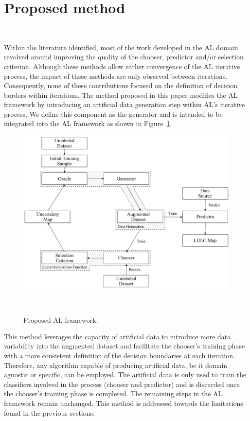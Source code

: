 \documentclass[parskip=full]{scrartcl}
\begin{document}
\section{Proposed method}~\label{sec:proposed-method}

Within the literature identified, most of the work developed in the AL domain
revolved around improving the quality of the chooser, predictor and/or selection
criterion. Although these methods allow earlier convergence of the AL iterative
process, the impact of these methods are only observed between iterations.
Consequently, none of these contributions focused on the definition of decision
borders within iterations. The method proposed in this paper modifies the AL
framework by introducing an artificial data generation step within AL's
iterative process. We define this component as the generator and is intended to
be integrated into the AL framework as shown in Figure~\ref{fig:al_new}. 

\begin{figure}[H]
	\centering
	\includegraphics[width=.85\linewidth]{../analysis/al_new}
	\caption{Proposed AL framework.
    }~\label{fig:al_new}
\end{figure}

This method leverages the capacity of artificial data to introduce more data
variability into the augmented dataset and facilitate the chooser's training
phase with a more consistent definition of the decision boundaries at each
iteration. Therefore, any algorithm capable of producing artificial data, be it
domain agnostic or specific, can be employed. The artificial data is only used
to train the classifiers involved in the process (chooser and predictor) and is
discarded once the chooser's training phase is completed. The remaining steps in
the AL framework remain unchanged. This method is addressed towards the
limitations found in the previous sections: 
\end{document}
